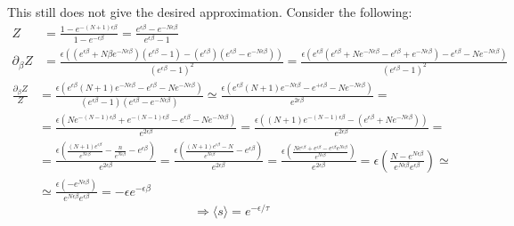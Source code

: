 \begin{itemize}
This still does not give the desired approximation.  Consider the following:
\[
\begin{aligned}
  Z & = \frac{ 1 - e^{ - (N+1) \epsilon \beta } }{ 1 - e^{- \epsilon \beta} } = \frac{ e^{\epsilon \beta} - e^{-N \epsilon \beta} }{ e^{\epsilon \beta} - 1 } \\
  \partial_{\beta} Z & = \frac{ \epsilon ( ( e^{\epsilon \beta} + N\beta e^{-N \epsilon \beta}  ) (e^{\epsilon \beta} - 1 ) - (e^{\epsilon \beta} )(e^{\epsilon \beta} - e^{- N \epsilon \beta} )  ) }{ (e^{\epsilon \beta} - 1 )^2 } = \frac{ \epsilon ( e^{\epsilon \beta} (e^{ \epsilon \beta} + N e^{- N\epsilon \beta} - e^{\epsilon \beta}  + e^{-N \epsilon \beta} ) - e^{ \epsilon \beta} - N e^{-N \epsilon \beta} ) }{ (e^{ \epsilon \beta} - 1 )^2 }
\end{aligned}
\]
\[
\begin{aligned}
  \frac{ \partial_{\beta} Z}{Z} & = \frac{ \epsilon (e^{\epsilon \beta} ( N+1)e^{-N\epsilon \beta } - e^{\epsilon \beta} - N e^{-N \epsilon \beta} ) }{ (e^{\epsilon \beta} - 1 ) (e^{\epsilon \beta} - e^{-N\epsilon \beta} ) } \simeq \frac{ \epsilon (e^{\epsilon \beta} (  N + 1) e^{-N \epsilon \beta} -e^{+ \epsilon \beta} - N e^{-N \epsilon \beta} ) }{ e^{2\epsilon \beta} }= \\ 
& = \frac{ \epsilon (Ne^{- (N-1) \epsilon \beta} + e^{-(N-1) \epsilon \beta} - e^{\epsilon \beta} - N e^{-N \epsilon \beta} ) }{ e^{2\epsilon \beta} }  = \frac{ \epsilon ( (N+1) e^{-(N-1) \epsilon \beta } - (e^{\epsilon \beta} + Ne^{-N \epsilon \beta} ) ) }{ e^{2\epsilon \beta} } = \\
  & = \frac{ \epsilon \left( \frac{ (N+1) e^{\epsilon \beta} }{ e^{N \epsilon \beta} } - \frac{n}{e^{N\epsilon \beta} } - e^{\epsilon \beta} \right) }{ e^{2\epsilon \beta} } = \frac{ \epsilon \left( \frac{ (N+1) e^{\epsilon \beta}  - N }{ e^{N\epsilon \beta} } - e^{\epsilon \beta} \right) }{ e^{2\epsilon \beta} } = \frac{ \epsilon \left( \frac{ N e^{\epsilon \beta}  + e^{\epsilon \beta} - e^{\epsilon \beta} e^{N \epsilon \beta} }{ e^{N \epsilon \beta} } \right) }{ e^{2 \epsilon \beta}} = \epsilon \left( \frac{ N - e^{N \epsilon \beta} }{ e^{N \epsilon \beta} e^{\epsilon \beta} } \right)  \simeq \\
  & \simeq \frac{ \epsilon ( -e^{N \epsilon \beta}  ) }{ e^{N \epsilon \beta} e^{\epsilon \beta} } = -\epsilon e^{-\epsilon \beta} 
\end{aligned}
\]
\[
\Longrightarrow \boxed{ \langle s \rangle = e^{- \epsilon /\tau }   }
\]
\end{itemize}







